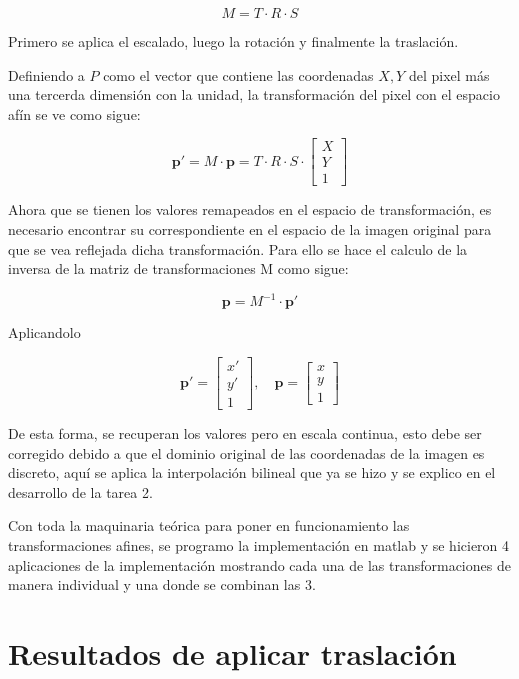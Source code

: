 \documentclass[11pt, letterpaper]{article}
\begin{document}
$$
M = T \cdot R \cdot S
$$

Primero se aplica el escalado, luego la rotación y finalmente la traslación.

Definiendo a $P$ como el vector que contiene las coordenadas $X,Y$ del pixel más una tercerda dimensión con la unidad, la transformación del pixel con el espacio afín se ve como sigue:

$$
\mathbf{p'} = M \cdot \mathbf{p} = T \cdot R \cdot S \cdot 
\begin{bmatrix}
	X \\
	Y \\
	1
\end{bmatrix}
$$

Ahora que se tienen los valores remapeados en el espacio de transformación, es necesario encontrar su correspondiente en el espacio de la imagen original para que se vea reflejada dicha transformación. Para ello se hace el calculo de la inversa de la matriz de transformaciones M como sigue:

$$
\mathbf{p} = M^{-1} \cdot \mathbf{p'}
$$

Aplicandolo

$$
\mathbf{p'} =
\begin{bmatrix}
	x' \\
	y' \\
	1
\end{bmatrix},
\quad
\mathbf{p} =
\begin{bmatrix}
	x \\
	y \\
	1
\end{bmatrix}
$$

De esta forma, se recuperan los valores pero en escala continua, esto debe ser corregido debido a que el dominio original de las coordenadas de la imagen es discreto, aquí se aplica la interpolación bilineal que ya se hizo y se explico en el desarrollo de la tarea 2.

Con toda la maquinaria teórica para poner en funcionamiento las transformaciones afines, se programo la implementación en matlab y se hicieron 4 aplicaciones de la implementación mostrando cada una de las transformaciones de manera individual y una donde se combinan las 3.





\newpage

\section{Resultados de aplicar traslación}
\end{document}
